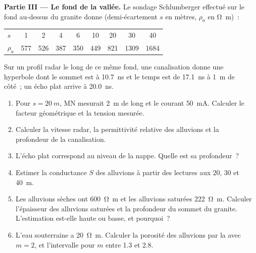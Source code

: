 \begin{problem}
\medskip\noindent\textbf{Partie III --- Le fond de la vallée.} Le sondage Schlumberger
effectué sur le fond au-dessus du granite donne (demi-écartement $s$ en
mètres, $\rho_a$ en \unit{\ohm\metre})~:
\begin{center}
\small
\begin{tabular}{lcccccccc}
\hline
$s$ & 1 & 2 & 4 & 6 & 10 & 20 & 30 & 40 \\
$\rho_a$ & 577 & 526 & 387 & 350 & 449 & 821 & 1309 & 1684 \\
\hline
\end{tabular}
\end{center}
Sur un profil radar le long de ce même fond, une canalisation donne une hyperbole dont
le sommet est à \qty{10.7}{ns} et le temps est de \qty{17.1}{ns} à \qty{1}{m}
de côté~; un écho plat arrive à \qty{20.0}{ns}.
\begin{enumerate}[resume]
\item Pour $s = \qty{20}{m}$, MN mesurait \qty{2}{m} de long et le courant
  \qty{50}{mA}. Calculer le facteur géométrique et la tension mesurée.
\item Calculer la vitesse radar, la permittivité relative des
  alluvions et la profondeur de la canalisation.
\item L'écho plat correspond au niveau de la nappe. Quelle est sa profondeur~?
\item Estimer la conductance $S$ des alluvions à partir des lectures aux
  20, 30 et \qty{40}{m}.
\item Les alluvions sèches ont \qty{600}{\ohm\metre} et les alluvions saturées
  \qty{222}{\ohm\metre}. Calculer l'épaisseur des alluvions saturées et la
  profondeur du sommet du granite. L'estimation est-elle haute
  ou basse, et pourquoi~?
\item L'eau souterraine a \qty{20}{\ohm\metre}. Calculer la porosité des
  alluvions par la  avec $m = 2$, et l'intervalle pour $m$
  entre \num{1.3} et \num{2.8}.
\end{enumerate}


\end{problem}
